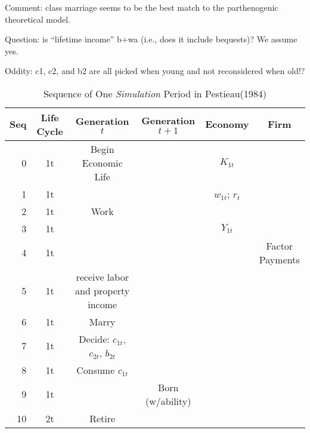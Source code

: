 \documentclass{article}
\begin{document}
Comment: class marriage seems to be the best match to the parthenogenic theoretical model.

Question: is ``lifetime income'' b+wa (i.e., does it include bequests)?  We assume yes.

Oddity: c1, c2, and b2 are all picked when young and not reconsidered when old!?


\newpage
\begin{table}
\caption{Sequence of One \emph{Simulation} Period in Pestieau(1984)}
\centering
\begin{tabular}{rccccc}\toprule


 {\bf Seq} & {\bf Life Cycle} & {\bf Generation $t$} & {\bf Generation $t+1$} & {\bf Economy} & {\bf Firm} \\
\midrule
         0 &         1t & Begin Economic Life &            &  $K_{1t}$ &            \\

         1 &         1t &            &            & $w_{1t}$; $r_{t}$ &            \\

         2 &         1t &       Work &            &            &            \\

         3 &         1t &            &            &  $Y_{1t}$ &            \\

         4 &         1t &            &            &            & Factor Payments \\

         5 &         1t & receive labor and property income &            &            &            \\

         6 &         1t &      Marry &            &            &            \\

         7 &         1t & Decide: $c_{1t}$, $c_{2t}$, $b_{2t}$  &            &            &            \\

         8 &         1t & Consume $c_{1t}$ &            &            &            \\

         9 &         1t &            & Born (w/ability) &            &            \\

        10 &         2t &     Retire &            &            &            \\


\end{tabular}
\end{table}
\end{document}
